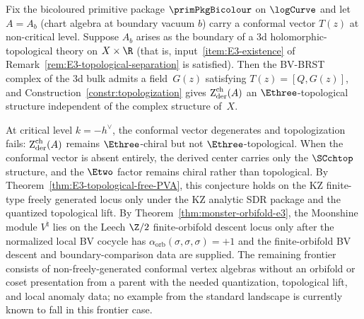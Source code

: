 \begin{conjecture}
\label{conj:E3-topological-general}
Fix the bicoloured primitive package $\primPkgBicolour$ on $\logCurve$
and let $A = A_b$ (chart algebra at boundary vacuum $b$) carry a
conformal vector $T(z)$ at non-critical level. Suppose $A_b$ arises
as the boundary of a $3$d holomorphic-topological theory on
$X \times \R$
\textup{(}that is, input~\textup{\ref{item:E3-existence}} of
Remark~\textup{\ref{rem:E3-topological-separation}} is
satisfied\textup{)}. Then the BV-BRST complex of the $3$d bulk
admits a field~$G(z)$ satisfying $T(z) = [Q, G(z)]$, and
Construction~\textup{\ref{constr:topologization}} gives
$\operatorname{Z}_{\mathrm{der}}^{\mathrm{ch}}(A)$ an $\Ethree$-topological structure
independent of the complex structure of~$X$.

At critical level $k = -h^{\vee}$, the conformal vector
degenerates and topologization fails: $\operatorname{Z}_{\mathrm{der}}^{\mathrm{ch}}(A)$
remains $\Ethree$-chiral but not $\Ethree$-topological. When
the conformal vector is absent entirely, the derived center
carries only the $\SCchtop$ structure, and the $\Etwo$ factor
remains chiral rather than topological.
By Theorem~\ref{thm:E3-topological-free-PVA}, this conjecture holds on
the KZ finite-type freely generated locus only under the KZ analytic SDR
package and the quantized topological lift. By
Theorem~\ref{thm:monster-orbifold-e3}, the Moonshine module
$V^\natural$ lies on the Leech $\Z/2$ finite-orbifold descent locus only
after the normalized local BV cocycle has
$\alpha_{\mathrm{orb}}(\sigma,\sigma,\sigma)=+1$ and the
finite-orbifold BV descent and boundary-comparison data are supplied.
The remaining frontier consists of non-freely-generated conformal
vertex algebras without an orbifold or coset presentation from a parent
with the needed quantization, topological lift, and local anomaly data;
no example from the standard landscape is currently known to fall in
this frontier case.
\end{conjecture}

